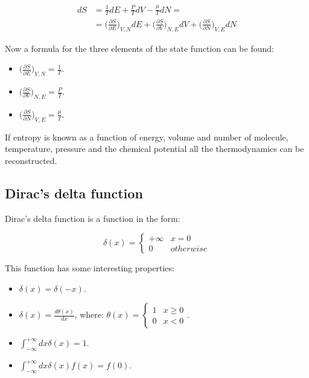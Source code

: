 	\begin{align*}
		dS &= \frac{1}{T}dE + \frac{P}{T}dV - \frac{\mu}{T}dN = \\
			 &= \biggl(\frac{\partial S}{\partial E}\biggr)_{V, N}dE +\biggl(\frac{\partial S}{\partial V}\biggr)_{N, E} dV + \biggl(\frac{\partial S}{\partial N}\biggr)_{V, E}dN
	\end{align*}

	Now a formula for the three elements of the state function can be found:

	\begin{multicols}{3}
		\begin{itemize}
			\item $\biggl(\frac{\partial S}{\partial E}\biggr)_{V, N} = \frac{1}{T}$.
			\item $\biggl(\frac{\partial S}{\partial V}\biggr)_{N, E} = \frac{P}{T}$.
			\item $\biggl(\frac{\partial S}{\partial N}\biggr)_{V, E} = \frac{\mu}{T}$.
		\end{itemize}
	\end{multicols}

	If entropy is known as a function of energy, volume and number of molecule, temperature, pressure and the chemical potential all the thermodynamics can be reconstructed.

	\subsection{Dirac's delta function}
	Dirac's delta function is a function in the form:

	$$\delta(x) = \begin{cases}+\infty & x = 0\\ 0 &otherwise\end{cases}$$

	This function has some interesting properties:

	\begin{multicols}{2}
		\begin{itemize}
			\item $\delta(x) = \delta(-x)$.
			\item $\delta(x) = \frac{d\theta(x)}{dx}$, where: $\theta(x) = \begin{cases}1 &x\ge 0\\0 &x< 0\end{cases}$.
			\item $\int_{-\infty}^{+\infty}dx\delta(x) = 1$.
			\item $\int_{-\infty}^{+\infty}dx\delta(x)f(x) = f(0)$.
		\end{itemize}
	\end{multicols}

